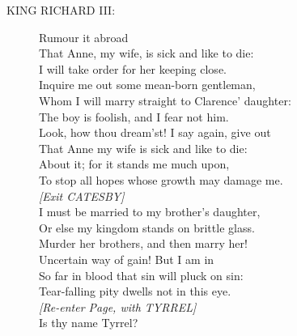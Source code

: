 \documentclass{article}
\begin{document}
\begin{description}
\item[KING RICHARD III:] 
\hspace{1pt}Rumour it abroad\\
\hspace{1pt}That Anne, my wife, is sick and like to die:\\
\hspace{1pt}I will take order for her keeping close.\\
\hspace{1pt}Inquire me out some mean-born gentleman,\\
\hspace{1pt}Whom I will marry straight to Clarence' daughter:\\
\hspace{1pt}The boy is foolish, and I fear not him.\\
\hspace{1pt}Look, how thou dream'st! I say again, give out\\
\hspace{1pt}That Anne my wife is sick and like to die:\\
\hspace{1pt}About it; for it stands me much upon,\\
\hspace{1pt}To stop all hopes whose growth may damage me.\\
{\it [Exit CATESBY]}\\
\hspace{1pt}I must be married to my brother's daughter,\\
\hspace{1pt}Or else my kingdom stands on brittle glass.\\
\hspace{1pt}Murder her brothers, and then marry her!\\
\hspace{1pt}Uncertain way of gain! But I am in\\
\hspace{1pt}So far in blood that sin will pluck on sin:\\
\hspace{1pt}Tear-falling pity dwells not in this eye.\\
{\it [Re-enter Page, with TYRREL]}\\
\hspace{1pt}Is thy name Tyrrel?\\
\end{description}
\end{document}
